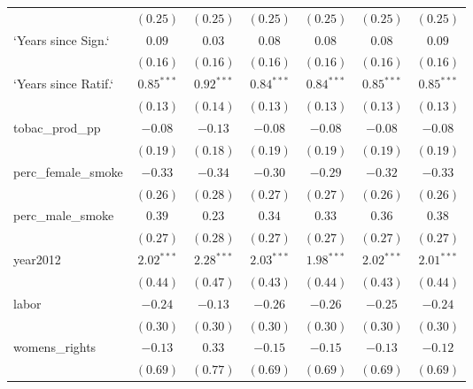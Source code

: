 \begin{table}[!h]
\begin{center}
\begin{tabular}{l c c c c c c }
                        & $(0.25)$     & $(0.25)$     & $(0.25)$     & $(0.25)$     & $(0.25)$     & $(0.25)$     \\
`Years since Sign.`     & $0.09$       & $0.03$       & $0.08$       & $0.08$       & $0.08$       & $0.09$       \\
                        & $(0.16)$     & $(0.16)$     & $(0.16)$     & $(0.16)$     & $(0.16)$     & $(0.16)$     \\
`Years since Ratif.`    & $0.85^{***}$ & $0.92^{***}$ & $0.84^{***}$ & $0.84^{***}$ & $0.85^{***}$ & $0.85^{***}$ \\
                        & $(0.13)$     & $(0.14)$     & $(0.13)$     & $(0.13)$     & $(0.13)$     & $(0.13)$     \\
tobac\_prod\_pp         & $-0.08$      & $-0.13$      & $-0.08$      & $-0.08$      & $-0.08$      & $-0.08$      \\
                        & $(0.19)$     & $(0.18)$     & $(0.19)$     & $(0.19)$     & $(0.19)$     & $(0.19)$     \\
perc\_female\_smoke     & $-0.33$      & $-0.34$      & $-0.30$      & $-0.29$      & $-0.32$      & $-0.33$      \\
                        & $(0.26)$     & $(0.28)$     & $(0.27)$     & $(0.27)$     & $(0.26)$     & $(0.26)$     \\
perc\_male\_smoke       & $0.39$       & $0.23$       & $0.34$       & $0.33$       & $0.36$       & $0.38$       \\
                        & $(0.27)$     & $(0.28)$     & $(0.27)$     & $(0.27)$     & $(0.27)$     & $(0.27)$     \\
year2012                & $2.02^{***}$ & $2.28^{***}$ & $2.03^{***}$ & $1.98^{***}$ & $2.02^{***}$ & $2.01^{***}$ \\
                        & $(0.44)$     & $(0.47)$     & $(0.43)$     & $(0.44)$     & $(0.43)$     & $(0.44)$     \\
labor                   & $-0.24$      & $-0.13$      & $-0.26$      & $-0.26$      & $-0.25$      & $-0.24$      \\
                        & $(0.30)$     & $(0.30)$     & $(0.30)$     & $(0.30)$     & $(0.30)$     & $(0.30)$     \\
womens\_rights          & $-0.13$      & $0.33$       & $-0.15$      & $-0.15$      & $-0.13$      & $-0.12$      \\
                        & $(0.69)$     & $(0.77)$     & $(0.69)$     & $(0.69)$     & $(0.69)$     & $(0.69)$     \\

\end{tabular}
\end{center}
\end{table}
